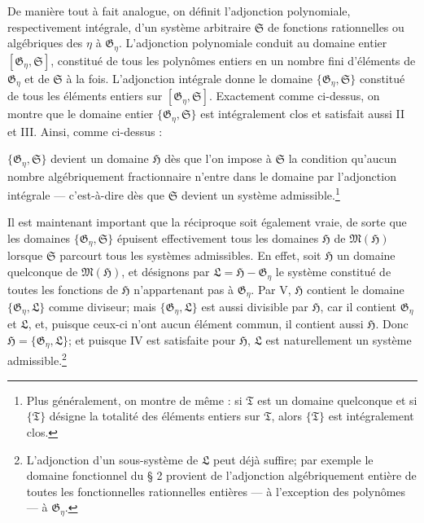 De manière tout à fait analogue, on définit l'adjonction polynomiale, respectivement intégrale, d'un système arbitraire $\mathfrak S$ de fonctions rationnelles ou algébriques des $\eta$ à $\mathfrak G_\eta$. L'adjonction polynomiale conduit au domaine entier $[\mathfrak G_\eta,\mathfrak S]$, constitué de tous les polynômes entiers en un nombre fini d'éléments de $\mathfrak G_\eta$ et de $\mathfrak S$ à la fois. L'adjonction intégrale donne le domaine $\{\mathfrak G_\eta,\mathfrak S\}$ constitué de tous les éléments entiers sur $[\mathfrak G_\eta,\mathfrak S]$. Exactement comme ci-dessus, on montre que le domaine entier $\{\mathfrak G_\eta,\mathfrak S\}$ est intégralement clos et satisfait aussi II et III. Ainsi, comme ci-dessus :

$\{\mathfrak G_\eta,\mathfrak S\}$ devient un domaine $\mathfrak H$ dès que l'on impose à $\mathfrak S$ la condition qu'aucun nombre algébriquement fractionnaire n'entre dans le domaine par l'adjonction intégrale --- c'est-à-dire dès que $\mathfrak S$ devient un système admissible.\footnote{Plus généralement, on montre de même : si $\mathfrak T$ est un domaine quelconque et si $\{\mathfrak T\}$ désigne la totalité des éléments entiers sur $\mathfrak T$, alors $\{\mathfrak T\}$ est intégralement clos.}

Il est maintenant important que la réciproque soit également vraie, de sorte que les domaines $\{\mathfrak G_\eta,\mathfrak S\}$ épuisent effectivement tous les domaines $\mathfrak H$ de $\mathfrak M(\mathfrak H)$ lorsque $\mathfrak S$ parcourt tous les systèmes admissibles. En effet, soit $\mathfrak H$ un domaine quelconque de $\mathfrak M(\mathfrak H)$, et désignons par $\mathfrak L=\mathfrak H-\mathfrak G_\eta$ le système constitué de toutes les fonctions de $\mathfrak H$ n'appartenant pas à $\mathfrak G_\eta$. Par V, $\mathfrak H$ contient le domaine $\{\mathfrak G_\eta,\mathfrak L\}$ comme diviseur; mais $\{\mathfrak G_\eta,\mathfrak L\}$ est aussi divisible par $\mathfrak H$, car il contient $\mathfrak G_\eta$ et $\mathfrak L$, et, puisque ceux-ci n'ont aucun élément commun, il contient aussi $\mathfrak H$. Donc $\mathfrak H=\{\mathfrak G_\eta,\mathfrak L\}$; et puisque IV est satisfaite pour $\mathfrak H$, $\mathfrak L$ est naturellement un système admissible.\footnote{L'adjonction d'un sous-système de $\mathfrak L$ peut déjà suffire; par exemple le domaine fonctionnel du \S{} 2 provient de l'adjonction algébriquement entière de toutes les fonctionnelles rationnelles entières --- à l'exception des polynômes --- à $\mathfrak G_\eta$.}


